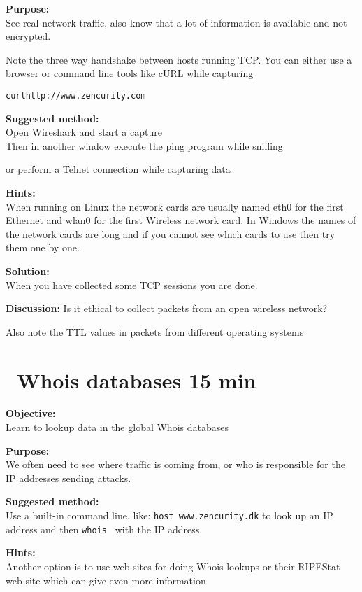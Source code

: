 \documentclass[a4paper,11pt,notitlepage]{report}
\begin{document}
{\bf Purpose:}\\
See real network traffic, also know that a lot of information is available and not encrypted.

Note the three way handshake between hosts running TCP. You can either use a browser or command line tools like cURL while capturing

\begin{alltt}
curl http://www.zencurity.com
\end{alltt}

{\bf Suggested method:}\\
Open Wireshark and start a capture\\
Then in another window execute the ping program while sniffing

or perform a Telnet connection while capturing data

{\bf Hints:}\\
When running on Linux the network cards are usually named eth0 for the first Ethernet and wlan0 for the first Wireless network card. In Windows the names of the network cards are long and if you cannot see which cards to use then try them one by one.

{\bf Solution:}\\
When you have collected some TCP sessions you are done.

{\bf Discussion:}
Is it ethical to collect packets from an open wireless network?

Also note the TTL values in packets from different operating systems

\chapter{\faExclamationTriangle\ Whois databases 15 min}
\label{ex:whois}

{\bf Objective:}\\
Learn to lookup data in the global Whois databases

{\bf Purpose:}\\
We often need to see where traffic is coming from, or who is responsible for the IP addresses sending attacks.

{\bf Suggested method:}\\
Use a built-in command line, like: \verb+host www.zencurity.dk+ to look up an IP address and then \verb+whois + with the IP address.

{\bf Hints:}\\
Another option is to use web sites for doing Whois lookups  or their RIPEStat web site which can give even more information
\end{document}
